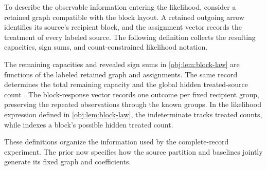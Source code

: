 To describe the observable information entering the likelihood, consider a retained graph compatible with the block layout. A retained outgoing arrow identifies its source's recipient block, and the assignment vector records the treatment of every labeled source. The following definition collects the resulting capacities, sign sums, and count-constrained likelihood notation.



The remaining capacities  and revealed sign sums  in \cref{obj:lem:block-law} are functions of the labeled retained graph and assignments. The same record determines the total remaining capacity  and the global hidden treated-source count . The block-response vector  records one outcome per fixed recipient group, preserving the repeated observations through the known groups. In the likelihood expression  defined in \cref{obj:lem:block-law}, the indeterminate  tracks treated counts, while  indexes a block's possible hidden treated count.

These definitions organize the information used by the complete-record experiment. The prior now specifies how the source partition and baselines jointly generate its fixed graph and coefficients.


